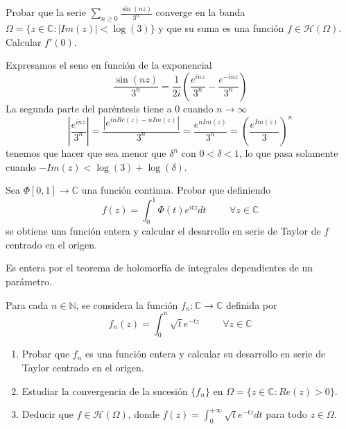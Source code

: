 \begin{ejer}
	Probar que la serie $\sum_{n\geq 0} \frac{\sin(nz)}{3^n}$ converge en la banda $\Omega = \{ z\in\mathbb{C} : |Im(z)|<\log(3) \}$ y que su suma es una función $f\in\mathcal{H}(\Omega)$. Calcular $f'(0)$.
\end{ejer}
\begin{sol}
Expresamos el seno en función de la exponencial
$$\frac{\sin(nz)}{3^n} = \frac{1}{2i} \left( \frac{e^{inz}}{3^n} - \frac{e^{-inz}}{3^n} \right)$$
La segunda parte del paréntesis tiene a 0 cuando $n\rightarrow \infty$
$$\left| \frac{e^{inz}}{3^n} \right| = \frac{|e^{inRe(z)-nIm(z)}|}{3^n} =
\frac{e^{nIm(z)}}{3^n} = 
\left( \frac{e^{Im(z)}}{3} \right)^n$$
tenemos que hacer que sea menor que $\delta^n$ con $0<\delta<1$, lo que pasa solamente cuando $-Im(z) < \log(3)+\log(\delta)$. 
\end{sol}

\begin{ejer}
	Sea $\Phi [0,1]\rightarrow\mathbb{C}$ una función continua. Probar que definiendo
	$$ f(z) = \int_{0}^{1} \Phi(t)e^{itz}dt \hspace{1cm} \forall z\in\mathbb{C} $$
	se obtiene una función entera y calcular el desarrollo en serie de Taylor de $f$ centrado en el origen.
\end{ejer}
\begin{sol}
Es entera por el teorema de holomorfía de integrales dependientes de un parámetro.
\end{sol}



\begin{ejer}
	Para cada $n\in\mathbb{N}$, se considera la función $f_n:\mathbb{C}\rightarrow\mathbb{C}$ definida por
	$$ f_n(z) = \int_{0}^{n} \sqrt{t}e^{-tz} \hspace{1cm} \forall z\in\mathbb{C} $$
	\begin{enumerate}[label=\alph*)]
		\item Probar que $f_n$ es una función entera y calcular su desarrollo en serie de Taylor centrado en el origen.
		\item Estudiar la convergencia de la sucesión $\{f_n\}$ en $\Omega = \{ z\in\mathbb{C} : Re(z)>0 \}$.
		\item Deducir que $f\in\mathcal{H}(\Omega)$, donde $f(z) = \int_{0}^{+\infty} \sqrt{t}e^{-tz}dt$ para todo $z\in\Omega$.
	\end{enumerate}
\end{ejer}

